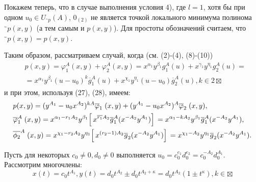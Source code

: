 \documentclass[11pt,reqno]{amsart}
\author{\MakeUppercase{В.Н.\,НЕФЁДОВ}}
\theoremstyle{plain}
\theoremstyle{definition}
\begin{document}
\Russian
Покажем теперь, что в случае выполнения условия 4), где $l = 1$, хотя бы при одном $u_0 \in U_{{}^{\textbf{\textasciitilde}}p}(A)$, $0_{(2)}$ не является точкой локального минимума полинома ${}^{\textbf{\textasciitilde}}p (x, y)$ (а тем самым и $p(x, y)$). Для простоты обозначений считаем, что ${{}^{\textbf{\textasciitilde}}}p(x, y) = p(x, y)$.

Таким образом, рассматриваем случай, когда (см. (2)-(4), (8)-(10))%
\begin{align*}
    &p(x, y) = \varphi_1^A(x,y) + \varphi_2^A(x, y) = x^{\alpha_1}y^{\beta_1}g_1^A(u)+x^{\gamma_1}y^{\eta_1}g_2^A(u)=\\
    &=x^{\alpha_1}y^{\beta_1}(u-u_0)^k\overline{g}_1^A(u) + x^{\chi_1}y^{\eta_1}(u-u_0)\overline{g}_2^A(u), k \in 2\boxtimes
\end{align*}
и при этом, используя (27), (28), имеем:%
\begin{align*}
    &p(x, y) = (y^{A_1} - u_0x^{A_2})^{kA}\overline{\varphi}_1\;(x, y) + (y^{A_1} - u_0x^{A_2})^A\overline{\varphi}_2\;(x, y),\\
    &\overline{\varphi}_1^A\;(x,y) = x^{\alpha_1-r_1A_2}y^{\beta_1}\Bigl[\, x^{\overline{r_1}A_2}\overline{g}_1^A(x^{-A_2}y^{A_1})\Bigr]\, = x^{\alpha_1-kA_2}y^{\beta_1}\overline{g}^A_1(x^{-A_2}y^{A_1}),\\
    &\overline{\phi_2}^A\;(x,y) = x^{\chi_1-r_2A_2}y^{\eta_1}\Bigl[\, x^{(r_2-1)A_2}\overline{g}_2(x^{-A_2}y^{A_1})\Bigr]\, = x^{\chi_1-A_2}y^{\eta_1}\overline{g}_2(x^{-A_2}y^{A_1}).
\end{align*}

Пусть для некоторых $c_0 \neq 0, d_0 \neq 0$ выполняется $u_0 = c_0^{e_1}d_0^{e_2} = c_0^{-A_2}d_0^{A_1}$. Рассмотрим многочлены:
\[x(t) = c_0t^{A_1}, y(t) = d_0t^{A_2}\pm d_0t^{A_2+\kappa} = d_0t^{A_2}(1 \pm t^\kappa), k \in \boxtimes\]
\end{document}
